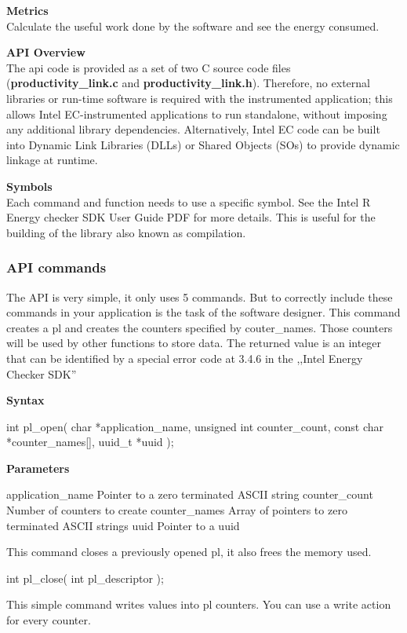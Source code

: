 \textbf{Metrics}
\\Calculate the useful work done by the software and see the energy consumed.

\textbf{API Overview}
\\The \gls{api} code is provided as a set of two C source code files (\textbf{productivity\_link.c} and \textbf{productivity\_link.h}). Therefore, no external libraries or run-time software is required with the instrumented application; this allows Intel EC-instrumented applications to run standalone, without imposing any additional library dependencies. Alternatively, Intel EC code can be built into Dynamic Link Libraries (DLLs) or Shared Objects (SOs) to provide dynamic linkage at runtime.

\textbf{Symbols}
\\Each command and function needs to use a specific symbol. See the Intel R Energy checker SDK  User Guide PDF for more details. This is useful for the building of the library also known as compilation.
\subsubsection{API commands}
The API is very simple, it only uses 5 commands. But to correctly include these commands in your application is the task of the software designer.
This command creates a \gls{pl} and creates the counters specified by couter\_names. Those counters will be used by other functions to store data. The returned value is an integer that can be identified by a special error code at 3.4.6 in the ,,Intel Energy Checker SDK''

\textbf{Syntax}
\begin{codelisting}
int pl_open(
	char *application_name,
	unsigned int counter_count,
	const char *counter_names[],
	uuid_t *uuid
);
\end{codelisting}

\textbf{Parameters}
\begin{codelisting}
application_name 	Pointer to a zero terminated ASCII string
counter_count 		Number of  counters to create
counter_names 		Array of pointers to zero terminated ASCII strings
uuid				Pointer to a uuid
\end{codelisting}
This command closes a previously opened \gls{pl}, it also frees the memory used.\nolinebreak
\begin{codelisting}
int pl_close(
	int pl_descriptor
);
\end{codelisting}
This simple command writes values into \gls{pl} counters. You can use a write action for every counter.\nolinebreak

